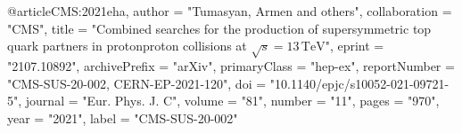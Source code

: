 @article{CMS:2021eha,
    author = "Tumasyan, Armen and others",
    collaboration = "CMS",
    title = "{Combined searches for the production of supersymmetric top quark partners in proton\textendash{}proton collisions at $\sqrt{s} = 13\,\text {Te}\text {V} $}",
    eprint = "2107.10892",
    archivePrefix = "arXiv",
    primaryClass = "hep-ex",
    reportNumber = "CMS-SUS-20-002, CERN-EP-2021-120",
    doi = "10.1140/epjc/s10052-021-09721-5",
    journal = "Eur. Phys. J. C",
    volume = "81",
    number = "11",
    pages = "970",
    year = "2021",
    label = "CMS-SUS-20-002"
}

